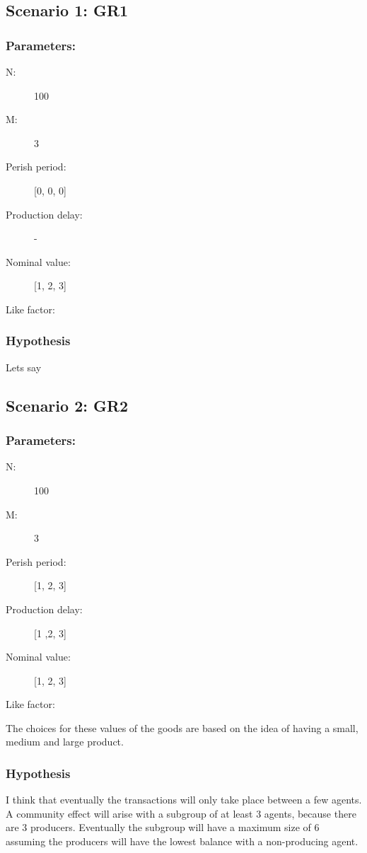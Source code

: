 \documentclass{article}
\begin{document}
\subsection{Scenario 1: GR1}
\subsubsection{Parameters:}
\begin{description}
  \item[N:] 100
  \item[M:] 3
  \item[Perish period:] [0, 0, 0]
  \item[Production delay:] -
  \item[Nominal value:] [1, 2, 3]
  \item[Like factor:] 
\end{description}

\subsubsection{Hypothesis}
Lets say 

\subsection{Scenario 2: GR2}
\subsubsection{Parameters:}
\begin{description}
  \item[N:] 100
  \item[M:] 3
  \item[Perish period:] [1, 2, 3]
  \item[Production delay:] [1 ,2, 3]
  \item[Nominal value:] [1, 2, 3]
  \item[Like factor:] 
\end{description}

The choices for these values of the goods are based on the idea of having a small, medium and large product.

\subsubsection{Hypothesis}
I think that eventually the transactions will only take place between a few agents. A community effect will arise with a subgroup of at least 3 agents, because there are 3 producers. Eventually the subgroup will have a maximum size of 6 assuming the producers will have the lowest balance with a non-producing agent.
\end{document}
